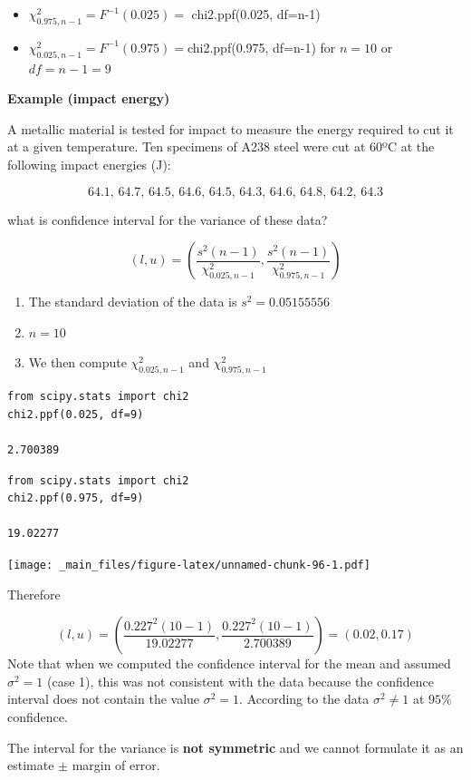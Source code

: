 \documentclass[
]{book}
\begin{document}
\begin{itemize}
\item
  \(\chi^2_{0.975,n-1}=F^{-1}(0.025)=\) chi2.ppf(0.025, df=n-1)
\item
  \(\chi^2_{0.025,n-1}=F^{-1}(0.975)=\)chi2.ppf(0.975, df=n-1)
  for \(n=10\) or \(df=n-1=9\)
\end{itemize}

\textbf{Example (impact energy)}

A metallic material is tested for impact to measure the energy required to cut it at a given temperature. Ten specimens of A238 steel were cut at 60ºC at the following impact energies (J):

\[64.1,\, 64.7,\, 64.5,\, 64.6,\, 64.5,\, 64.3,\, 64.6,\, 64.8,\, 64.2,\, 64.3\]

what is confidence interval for the variance of these data?

\[(l,u) = (\frac{s^2 (n-1)}{\chi^2_{0.025,n-1}},\frac{s^2(n-1)}{\chi^2_{0.975,n-1}})\]

\begin{enumerate}
\def\labelenumi{\arabic{enumi}.}
\item
  The standard deviation of the data is \(s^2=0.05155556\)
\item
  \(n=10\)
\item
  We then compute \(\chi^2_{0.025,n-1}\) and \(\chi^2_{0.975,n-1}\)
\end{enumerate}

\begin{verbatim}
from scipy.stats import chi2
chi2.ppf(0.025, df=9)

2.700389
\end{verbatim}

\begin{verbatim}
from scipy.stats import chi2
chi2.ppf(0.975, df=9)

19.02277
\end{verbatim}

\texttt{[image: \_main\_files/figure-latex/unnamed-chunk-96-1.pdf]}

Therefore

\[(l,u)= (\frac{0.227^2 (10-1)}{19.02277},\frac{0.227^2(10-1)}{2.700389})=(0.02,0.17)\]
Note that when we computed the confidence interval for the mean and assumed \(\sigma^2=1\) (case 1), this was not consistent with the data because the confidence interval does not contain the value \(\sigma^2=1\).
According to the data \(\sigma^2 \neq 1\) at \(95\%\) confidence.

The interval for the variance is \textbf{not symmetric} and we cannot formulate it as an estimate \(\pm\) margin of error.
\end{document}
